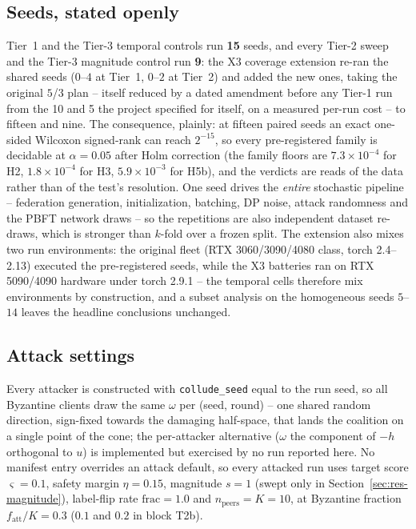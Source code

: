 \documentclass[review,12pt]{elsarticle}
\begin{document}
\subsection{Seeds, stated openly}
\label{sec:sup-seeds}

Tier~1 and the Tier-3 temporal controls run \textbf{15} seeds, and every
Tier-2 sweep and the Tier-3 magnitude control run \textbf{9}: the X3
coverage extension re-ran the shared seeds ($0$--$4$ at Tier~1,
$0$--$2$ at Tier~2) and added the new ones, taking the original $5$/$3$
plan -- itself reduced by a dated amendment before any Tier-1 run from
the 10 and 5 the project specified for itself, on a measured per-run
cost -- to fifteen and nine. The consequence, plainly: at fifteen paired
seeds an exact one-sided Wilcoxon signed-rank can reach $2^{-15}$, so
every pre-registered family is decidable at $\alpha=0.05$ after Holm
correction (the family floors are $7.3\times10^{-4}$ for H2,
$1.8\times10^{-4}$ for H3, $5.9\times10^{-3}$ for H5b), and the verdicts
are reads of the data rather than of the test's resolution. One seed
drives the \emph{entire} stochastic pipeline -- federation generation,
initialization, batching, DP noise, attack randomness and the PBFT
network draws -- so the repetitions are also independent dataset
re-draws, which is stronger than $k$-fold over a frozen split. The
extension also mixes two run environments: the original fleet (RTX
3060/3090/4080 class, torch 2.4--2.13) executed the pre-registered
seeds, while the X3 batteries ran on RTX 5090/4090 hardware under torch
2.9.1 -- the temporal cells therefore mix environments by construction,
and a subset analysis on the homogeneous seeds $5$--$14$ leaves the
headline conclusions unchanged.

\subsection{Attack settings}
\label{sec:sup-attacksettings}

Every attacker is constructed with \texttt{collude\_seed} equal to the
run seed, so all Byzantine clients draw the same $\omega$ per (seed,
round) -- one shared random direction, sign-fixed towards the damaging
half-space, that lands the coalition on a single point of the cone; the
per-attacker alternative ($\omega$ the component of $-h$ orthogonal to
$u$) is implemented but exercised by no run reported here. No manifest
entry overrides an attack default, so every attacked run uses target
score $\varsigma = 0.1$, safety margin $\eta = 0.15$, magnitude $s = 1$
(swept only in Section~\ref{sec:res-magnitude}), label-flip rate
$\mathrm{frac} = 1.0$ and $n_{\mathrm{peers}} = K = 10$, at Byzantine
fraction $f_{\mathrm{att}}/K = 0.3$ ($0.1$ and $0.2$ in block T2b).
\end{document}
